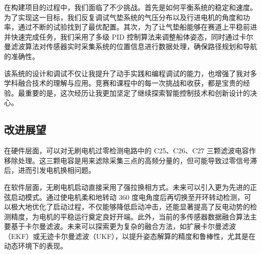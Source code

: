 在构建项目的过程中，我们面临了不少挑战。首先是如何平衡系统的稳定和速度。为了实现这一目标，我们反复调试气垫系统的气压分布以及行进电机的角度和功率，通过不断的试验找到了最优配置。其次，为了让气垫船能够在赛道上平稳前进并快速完成任务，我们采用了多级 PID 控制算法来调整船体姿态，同时通过卡尔曼滤波算法对传感器实时采集系统的位置信息进行数据处理，确保路径规划和导航的准确性。

该系统的设计和调试不仅让我提升了动手实践和编程调试的能力，也增强了我对多学科融合技术的理解与应用。竞赛和课程中的每一次挑战和收获，都是宝贵的经验。最重要的是，这次经历让我更加坚定了继续探索智能控制技术和创新设计的决心。
\subsection{改进展望}
在硬件层面，可以对无刷电机过零检测电路中的 C25、C26、C27 三颗滤波电容作移除处理。这三颗电容是用来滤除采集三点的高频分量的，但可能导致过零信号滞后，进而引发电机换相问题。

在软件层面，无刷电机启动直接采用了强拉换相方式。未来可以引入更为先进的正弦启动模式。通过使电机柔和地转动 360 度电角度后再切换至开环转动检测，可以极大地优化了启动过程，不仅能够降低启动冲击，还能显著提高了反电动势的检测精度，为电机的平稳运行奠定良好开端。此外，当前的多传感器数据融合算法主要基于卡尔曼滤波。未来可以探索更为复杂的融合方法，如扩展卡尔曼滤波（EKF）或无迹卡尔曼滤波（UKF），以提升姿态解算的精度和鲁棒性，尤其是在动态环境下的表现。